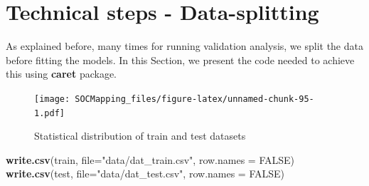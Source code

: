 \documentclass[10pt,b5paper,]{book}
\newenvironment{Shaded}{\begin{snugshade}}{\end{snugshade}}
\newcommand{\DataTypeTok}[1]{\textcolor[rgb]{0.13,0.29,0.53}{#1}}
\newcommand{\DecValTok}[1]{\textcolor[rgb]{0.00,0.00,0.81}{#1}}
\newcommand{\FloatTok}[1]{\textcolor[rgb]{0.00,0.00,0.81}{#1}}
\newcommand{\KeywordTok}[1]{\textcolor[rgb]{0.13,0.29,0.53}{\textbf{#1}}}
\newcommand{\NormalTok}[1]{#1}
\newcommand{\OperatorTok}[1]{\textcolor[rgb]{0.81,0.36,0.00}{\textbf{#1}}}
\newcommand{\OtherTok}[1]{\textcolor[rgb]{0.56,0.35,0.01}{#1}}
\newcommand{\StringTok}[1]{\textcolor[rgb]{0.31,0.60,0.02}{#1}}
\theoremstyle{definition}
\theoremstyle{definition}
\theoremstyle{definition}
\theoremstyle{remark}
\begin{document}
\hypertarget{dataSplit}{%
\section{Technical steps - Data-splitting}\label{dataSplit}}

As explained before, many times for running validation analysis, we
split the data before fitting the models. In this Section, we present
the code needed to achieve this using \textbf{caret} package.

\begin{Shaded}
\end{Shaded}

\begin{figure}
\centering
\texttt{[image: SOCMapping\_files/figure-latex/unnamed-chunk-95-1.pdf]}
\caption{\label{fig:unnamed-chunk-95}Statistical distribution of train and
test datasets}
\end{figure}

\begin{Shaded}
\begin{Highlighting}[]
\KeywordTok{write.csv}\NormalTok{(train, }\DataTypeTok{file=}\StringTok{"data/dat_train.csv"}\NormalTok{, }\DataTypeTok{row.names =} \OtherTok{FALSE}\NormalTok{)}
\KeywordTok{write.csv}\NormalTok{(test, }\DataTypeTok{file=}\StringTok{"data/dat_test.csv"}\NormalTok{, }\DataTypeTok{row.names =} \OtherTok{FALSE}\NormalTok{)}
\end{Highlighting}
\end{Shaded}
\end{document}
